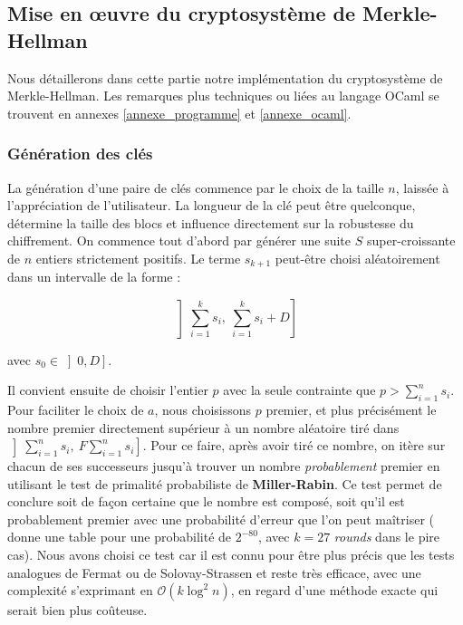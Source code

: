 \documentclass[a4paper,10pt]{article}
\begin{document}
\subsection{Mise en œuvre du cryptosystème de Merkle-Hellman}

Nous détaillerons dans cette partie notre implémentation du cryptosystème de Merkle-Hellman. Les remarques plus techniques ou liées au langage OCaml se trouvent en annexes \ref{annexe_programme} et \ref{annexe_ocaml}.

\subsubsection{Génération des clés}
\label{generation_cle}

La génération d'une paire de clés commence par le choix de la taille $n$, laissée à l'appréciation de l'utilisateur. La longueur de la clé peut être quelconque, détermine la taille des blocs et influence directement sur la robustesse du chiffrement. On commence tout d'abord par générer une suite $S$ super-croissante de $n$ entiers strictement positifs. Le terme $s_{k+1}$ peut-être choisi aléatoirement dans un intervalle de la forme :

$$\left] \sum \limits_{{i=1}}^{k} s_i,~\sum \limits_{{i=1}}^{k} s_i + D \right]$$

avec $s_0\in  \left] 0,D \right]$. 

Il convient ensuite de choisir l'entier $p$ avec la seule contrainte que $p > \sum \limits_{{i=1}}^{n} s_i$. Pour faciliter le choix de $a$, nous choisissons $p$ premier, et plus précisément le nombre premier directement supérieur à un nombre aléatoire tiré dans $\left] \sum \limits_{{i=1}}^{n} s_i,~F \sum \limits_{{i=1}}^{n} s_i \right]$. Pour ce faire, après avoir tiré ce nombre, on itère sur chacun de ses successeurs jusqu'à trouver un nombre \textit{probablement} premier en utilisant le test de primalité probabiliste de \textbf{Miller-Rabin}. Ce test permet de conclure soit de façon certaine que le nombre est composé, soit qu'il est probablement premier avec une probabilité d'erreur que l'on peut maîtriser (\cite{opac} donne une table pour une probabilité de $2^{-80}$, avec $k = 27$ \textit{rounds} dans le pire cas). Nous avons choisi ce test car il est connu pour être plus précis que les tests analogues de Fermat ou de Solovay-Strassen et reste très efficace, avec une complexité s'exprimant en $\mathcal{O}(k\log^2{n})$, en regard d'une méthode exacte qui serait bien plus coûteuse.
\end{document}
